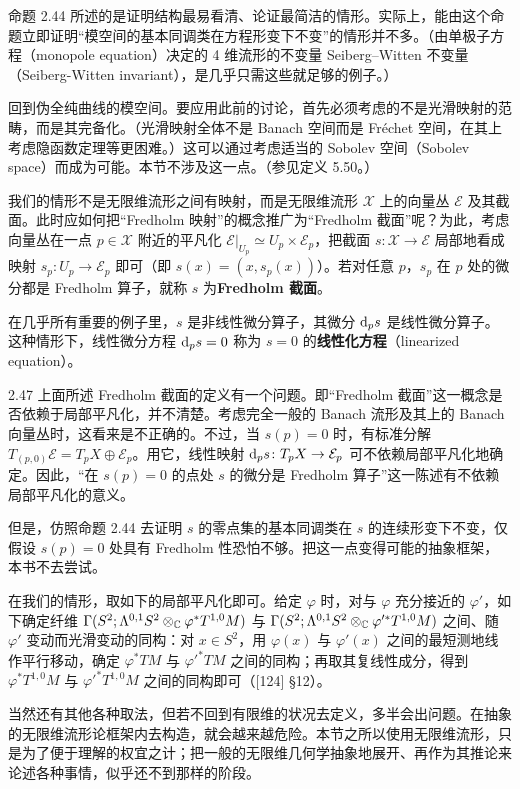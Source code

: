 命题 2.44 所述的是证明结构最易看清、论证最简洁的情形。实际上，能由这个命题立即证明“模空间的基本同调类在方程形变下不变”的情形并不多。（由单极子方程（monopole equation）决定的 4 维流形的不变量 Seiberg–Witten 不变量（Seiberg-Witten invariant），是几乎只需这些就足够的例子。）

回到伪全纯曲线的模空间。要应用此前的讨论，首先必须考虑的不是光滑映射的范畴，而是其完备化。（光滑映射全体不是 Banach 空间而是 Fréchet 空间，在其上考虑隐函数定理等更困难。）这可以通过考虑适当的 Sobolev 空间（Sobolev space）而成为可能。本节不涉及这一点。（参见定义 5.50。）

我们的情形不是无限维流形之间有映射，而是无限维流形 $\mathcal{X}$ 上的向量丛 $\mathcal{E}$ 及其截面。此时应如何把“Fredholm 映射”的概念推广为“Fredholm 截面”呢？为此，考虑向量丛在一点 $p\in\mathcal{X}$ 附近的平凡化 $\mathcal{E}|_{U_p}\simeq U_p\times\mathcal{E}_p$，把截面 $s\colon\mathcal{X}\to\mathcal{E}$ 局部地看成映射 $s_p\colon U_p\to\mathcal{E}_p$ 即可（即 $s(x)=(x,s_p(x))$）。若对任意 $p$，$s_p$ 在 $p$ 处的微分都是 Fredholm 算子，就称 $s$ 为\textbf{Fredholm 截面}。

在几乎所有重要的例子里，$s$ 是非线性微分算子，其微分 $\mathrm{d}_ps$ 是线性微分算子。这种情形下，线性微分方程 $\mathrm{d}_ps=0$ 称为 $s=0$ 的\textbf{线性化方程}（linearized equation）。

\begin{remark}{2.47}
  上面所述 Fredholm 截面的定义有一个问题。即“Fredholm 截面”这一概念是否依赖于局部平凡化，并不清楚。考虑完全一般的 Banach 流形及其上的 Banach 向量丛时，这看来是不正确的。不过，当 $s(p)=0$ 时，有标准分解 $T_{(p,0)}\mathcal{E}=T_pX\oplus\mathcal{E}_p$。用它，线性映射 $\mathrm{d}_ps\colon T_pX\to\mathcal{E}_p$ 可不依赖局部平凡化地确定。因此，“在 $s(p)=0$ 的点处 $s$ 的微分是 Fredholm 算子”这一陈述有不依赖局部平凡化的意义。

  但是，仿照命题 2.44 去证明 $s$ 的零点集的基本同调类在 $s$ 的连续形变下不变，仅假设 $s(p)=0$ 处具有 Fredholm 性恐怕不够。把这一点变得可能的抽象框架，本书不去尝试。

  在我们的情形，取如下的局部平凡化即可。给定 $\varphi$ 时，对与 $\varphi$ 充分接近的 $\varphi'$，如下确定纤维 $\Gamma(S^2;\Lambda^{0,1}S^2\otimes_{\mathbb{C}}\varphi^*T^{1,0}M)$ 与 $\Gamma(S^2;\Lambda^{0,1}S^2\otimes_{\mathbb{C}}\varphi'^*T^{1,0}M)$ 之间、随 $\varphi'$ 变动而光滑变动的同构：对 $x\in S^2$，用 $\varphi(x)$ 与 $\varphi'(x)$ 之间的最短测地线作平行移动，确定 $\varphi^*TM$ 与 $\varphi'^*TM$ 之间的同构；再取其复线性成分，得到 $\varphi^*T^{1,0}M$ 与 $\varphi'^*T^{1,0}M$ 之间的同构即可（[124] §12）。

  当然还有其他各种取法，但若不回到有限维的状况去定义，多半会出问题。在抽象的无限维流形论框架内去构造，就会越来越危险。本节之所以使用无限维流形，只是为了便于理解的权宜之计；把一般的无限维几何学抽象地展开、再作为其推论来论述各种事情，似乎还不到那样的阶段。
\end{remark}

